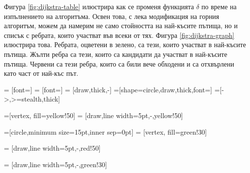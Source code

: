 Фигура \ref{fig:dijkstra-table} илюстрира как се променя функцията $\delta$ по време на изпълнението на алгоритъма.
Освен това, с лека модификация на горния алгоритъм, можем да намерим не само стойността на най-късите пътища, но
и списък с ребрата, които участват във всеки от тях. Фигура \ref{fig:dijkstra-graph} илюстрира това.
Ребрата, оцветени в зелено, са тези, които участват в най-късите пътища.
Жълти ребра са тези, които са кандидати да участват в най-късите пътища.
Червени са тези ребра, които са били вече обходени и са отхвърлени като част от най-къс път.

 = [font=\small]
 = [font=\small]
 = [draw,thick,-]
=[shape=circle,draw,thick,font=\small]
=[->,>=stealth,thick]

=[vertex, fill=yellow!50]
 = [draw,line width=5pt,-,yellow!50]

=[circle,minimum size=15pt,inner sep=0pt]
 = [vertex, fill=green!30]

 = [draw,line width=5pt,-,red!50]

 = [draw,line width=5pt,-,green!30]


